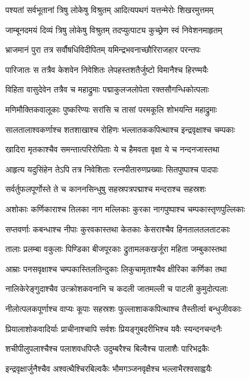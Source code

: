 \twolineshloka
{पश्यतां सर्वभूतानां त्रिषु लोकेषु विश्रुतम्}
{आदित्यपथगं यत्तन्मेरोः शिखरमुत्तमम्}


\twolineshloka
{जाम्बूनदमयं दिव्यं त्रिषु लोकेषु विश्रुतम्}
{तदप्युत्पाट्य कुच्छ्रेण स्वं निवेशनमाहृतम्}


\twolineshloka
{भ्राजमानं पुरा तत्र सर्वौषधिविदीपितम्}
{यमिन्द्रभवनाच्छौरिराजहार परन्तपः}


\twolineshloka
{पारिजातः स तत्रैव केशवेन निवेशितः}
{लेपहस्तशतैर्जुष्टो विमानैश्च हिरण्मयैः}


\twolineshloka
{विहिता वासुदेवेन तत्रैव च महाद्रुमाः}
{पद्माकुलजलोपेता रक्तसौगन्धिकोत्पलाः}


\twolineshloka
{मणिमौक्तिकवालूकाः पुष्करिण्यः सरांसि च}
{तासां परमकूलि शोभयन्ति महाद्रुमाः}


\twolineshloka
{सालतालाश्वकर्णाश्च शतशाखाश्च रोहिणः}
{भल्लातककपित्थाश्च इन्द्रवृक्षाश्च चम्पकाः}


\twolineshloka
{खादिरा मृतकाश्चैव समन्तात्परिरोपिताः}
{ये च हैमवता वृक्षा ये च नन्दनजास्तथा}


\twolineshloka
{आहृत्य यदुसिंहेन तेऽपि तत्र निवेशिताः}
{रत्नपीतारुणप्रख्याः सितपुष्पाश्च पादपाः}


\twolineshloka
{सर्वर्तुफलपूर्णोस्ते ते च काननसिन्धुषु}
{सहस्रपत्रपद्माश्च मन्दराश्च सहस्रशः}


\twolineshloka
{अशोकाः कर्णिकाराश्च तिलका नाग मल्लिकाः}
{कुरका नागपुष्पाश्च चम्पकास्तृणपुल्लिकाः}


\twolineshloka
{सप्तवर्णाः कबन्धाश्च नीपाः कुरवकास्तथा}
{केतकाः केसराश्चैव हिनतालतलताटकाः}


\twolineshloka
{तालाः प्रलम्बा वकुलाः पिण्डिका बीजपूरकाः}
{द्रुतामलकखर्जूरा महिता जम्बुकास्तथा}


\twolineshloka
{आम्राः पनसवृक्षाश्च चम्पकास्तिलतिन्दुकाः}
{लिकुचामृताश्चैव क्षीरिका कर्णिका तथा}


\twolineshloka
{नालिकेरेङ्गुदाश्चैव उत्क्रोशकवनानि च}
{कदली जातमल्ली च पाटली कुमुदोत्पलाः}


\twolineshloka
{नीलोत्पलकपूर्णाश्च वाप्यः कूपाः सहस्रशः}
{फुल्लाशाककपित्थाश्च तैस्तीर्त्वा बन्धुजीवकाः}


\twolineshloka
{प्रियालाशोकवादिर्याः प्राचीनाश्चापि सर्वशः}
{प्रियङ्गुबदरीभिश्च यवैः स्यन्दनचन्दनैः}


\twolineshloka
{शचीपीलुपलाश्चैश्च पलाशवधपिप्लैः}
{उदुम्बरैश्च बिल्वैश्च पालाशैः पारिभद्रकैः}


\twolineshloka
{इन्द्रवृक्षार्जुनैश्चैव अश्वत्थैश्चिरबिल्वकैः}
{भौमगञ्जनवृक्षैश्च भल्लाभैरश्वसाह्वयैः}


